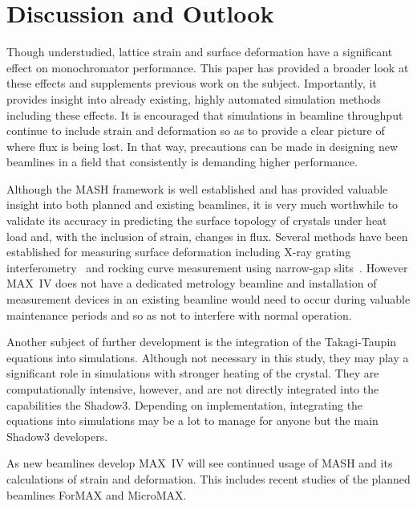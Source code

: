 \documentclass{iucr}
\begin{document}
\section{Discussion and Outlook}

Though understudied, lattice strain and surface deformation have a significant effect on monochromator performance. This paper has provided a broader look at these effects and supplements previous work on the subject. Importantly, it provides insight into already existing, highly automated simulation methods including these effects. It is encouraged that simulations in beamline throughput continue to include strain and deformation so as to provide a clear picture of where flux is being lost. In that way, precautions can be made in designing new beamlines in a field that consistently is demanding higher performance.

Although the MASH framework is well established and has provided valuable insight into both planned and existing beamlines, it is very much worthwhile to validate its accuracy in predicting the surface topology of crystals under heat load and, with the inclusion of strain, changes in flux. Several methods have been established for measuring surface deformation including X-ray grating interferometry~\cite{rutishauser} and rocking curve measurement using narrow-gap slits~\cite{Zhang}. However MAX~IV does not have a dedicated metrology beamline and installation of measurement devices in an existing beamline would need to occur during valuable maintenance periods and so as not to interfere with normal operation.

Another subject of further development is the integration of the Takagi-Taupin equations into simulations. Although not necessary in this study, they may play a significant role in simulations with stronger heating of the crystal. They are computationally intensive, however, and are not directly integrated into the capabilities the Shadow3. Depending on implementation, integrating the equations into simulations may be a lot to manage for anyone but the main Shadow3 developers.

As new beamlines develop MAX~IV will see continued usage of MASH and its calculations of strain and deformation. This includes recent studies of the planned beamlines ForMAX and MicroMAX.


\end{document}
